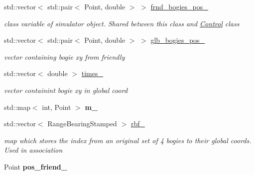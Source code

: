 \begin{DoxyCompactItemize}
\mbox{\label{classBogiepos_acdafe3f586665301295284508f343d23}} 
std\+::vector$<$ std\+::pair$<$ Point, double $>$ $>$ \hyperlink{classBogiepos_acdafe3f586665301295284508f343d23}{frnd\+\_\+bogies\+\_\+pos\+\_\+}
\begin{DoxyCompactList}\small\item\em class variable of simulator object. Shared between this class and \hyperlink{classControl}{Control} class \end{DoxyCompactList}\item 
\mbox{\label{classBogiepos_aa642cf929d826b3ed1ae9fadb27323d6}} 
std\+::vector$<$ std\+::pair$<$ Point, double $>$ $>$ \hyperlink{classBogiepos_aa642cf929d826b3ed1ae9fadb27323d6}{glb\+\_\+bogies\+\_\+pos\+\_\+}
\begin{DoxyCompactList}\small\item\em vector containing bogie xy from friendly \end{DoxyCompactList}\item 
\mbox{\label{classBogiepos_aa7750ca662f485c6374eb4bd074bdf00}} 
std\+::vector$<$ double $>$ \hyperlink{classBogiepos_aa7750ca662f485c6374eb4bd074bdf00}{times\+\_\+}
\begin{DoxyCompactList}\small\item\em vector containint bogie xy in global coord \end{DoxyCompactList}\item 
\mbox{\label{classBogiepos_ae6ca05a0ddb131bf0b66a5e35ceb30e4}} 
std\+::map$<$ int, Point $>$ {\bfseries m\+\_\+}
\item 
\mbox{\label{classBogiepos_a8820b715858b2c25ebd45c7641da96a2}} 
std\+::vector$<$ Range\+Bearing\+Stamped $>$ \hyperlink{classBogiepos_a8820b715858b2c25ebd45c7641da96a2}{rbf\+\_\+}
\begin{DoxyCompactList}\small\item\em map which stores the index from an original set of 4 bogies to their global coords. Used in association \end{DoxyCompactList}\item 
\mbox{\label{classBogiepos_a162e3d9be75bf8c0281ddbc56b40fb62}} 
Point {\bfseries pos\+\_\+friend\+\_\+}
\item 

\end{DoxyCompactItemize}
